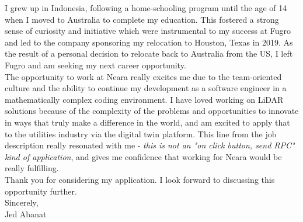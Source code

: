 I grew up in Indonesia, following a home-schooling program until the age of 14 when I moved to Australia to complete my education. This fostered a strong sense of curiosity and initiative which were instrumental to my success at Fugro and led to the company sponsoring my relocation to Houston, Texas in 2019. As the result of a personal decision to relocate back to Australia from the US, I left Fugro and am seeking my next career opportunity. \\

The opportunity to work at Neara really excites me due to the team-oriented culture and the ability to continue my development as a software engineer in a mathematically complex coding environment. I have loved working on LiDAR solutions because of the complexity of the problems and opportunities to innovate in ways that truly make a difference in the world, and am excited to apply that to the utilities industry via the digital twin platform. This line from the job description really resonated with me -  \textit{this is not an "on click button, send RPC" kind of application}, and gives me confidence that working for Neara would be really fulfilling.\\

Thank you for considering my application. I look forward to discussing this opportunity further. \\

Sincerely,\\
Jed Abanat